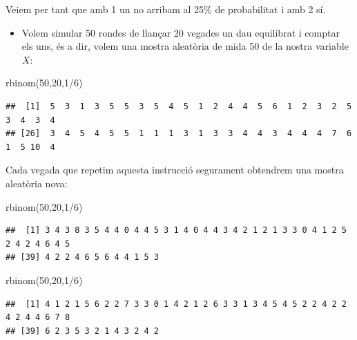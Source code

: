 \documentclass[
]{book}
\newenvironment{Shaded}{\begin{snugshade}}{\end{snugshade}}
\newcommand{\DecValTok}[1]{\textcolor[rgb]{0.00,0.00,0.81}{#1}}
\newcommand{\FunctionTok}[1]{\textcolor[rgb]{0.00,0.00,0.00}{#1}}
\newcommand{\NormalTok}[1]{#1}
\newcommand{\SpecialCharTok}[1]{\textcolor[rgb]{0.00,0.00,0.00}{#1}}
\providecommand{\tightlist}{%
  \setlength{\itemsep}{0pt}\setlength{\parskip}{0pt}}
\theoremstyle{definition}
\theoremstyle{definition}
\theoremstyle{definition}
\theoremstyle{remark}
\begin{document}
Veiem per tant que amb 1 un no arribam al 25\% de probabilitat i amb 2 sí.

\begin{itemize}
\tightlist
\item
  Volem simular 50 rondes de llançar 20 vegades un dau equilibrat i comptar els uns, és a dir, volem una mostra aleatòria de mida 50 de la nostra variable \(X\):
\end{itemize}

\begin{Shaded}
\begin{Highlighting}[]
\FunctionTok{rbinom}\NormalTok{(}\DecValTok{50}\NormalTok{,}\DecValTok{20}\NormalTok{,}\DecValTok{1}\SpecialCharTok{/}\DecValTok{6}\NormalTok{)}
\end{Highlighting}
\end{Shaded}

\begin{verbatim}
##  [1]  5  3  1  3  5  5  3  5  4  5  1  2  4  4  5  6  1  2  3  2  5  3  4  3  4
## [26]  3  4  5  4  5  5  1  1  1  3  1  3  3  4  4  3  4  4  4  7  6  1  5 10  4
\end{verbatim}

Cada vegada que repetim aquesta instrucció segurament obtendrem una mostra aleatòria nova:

\begin{Shaded}
\begin{Highlighting}[]
\FunctionTok{rbinom}\NormalTok{(}\DecValTok{50}\NormalTok{,}\DecValTok{20}\NormalTok{,}\DecValTok{1}\SpecialCharTok{/}\DecValTok{6}\NormalTok{)}
\end{Highlighting}
\end{Shaded}

\begin{verbatim}
##  [1] 3 4 3 8 3 5 4 4 0 4 4 5 3 1 4 0 4 4 3 4 2 1 2 1 3 3 0 4 1 2 5 2 4 2 4 6 4 5
## [39] 4 2 2 4 6 5 6 4 4 1 5 3
\end{verbatim}

\begin{Shaded}
\begin{Highlighting}[]
\FunctionTok{rbinom}\NormalTok{(}\DecValTok{50}\NormalTok{,}\DecValTok{20}\NormalTok{,}\DecValTok{1}\SpecialCharTok{/}\DecValTok{6}\NormalTok{)}
\end{Highlighting}
\end{Shaded}

\begin{verbatim}
##  [1] 4 1 2 1 5 6 2 2 7 3 3 0 1 4 2 1 2 6 3 3 1 3 4 5 4 5 2 2 4 2 2 4 2 4 4 6 7 8
## [39] 6 2 3 5 3 2 1 4 3 2 4 2
\end{verbatim}
\end{document}
